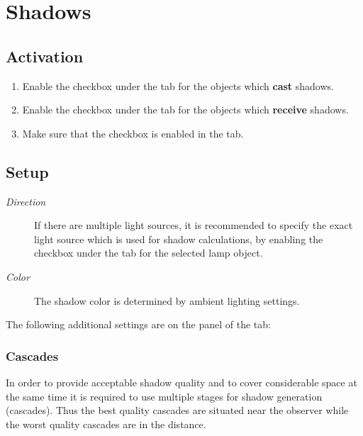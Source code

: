 \documentclass[a4paper,12pt,oneside]{sphinxmanual}
\begin{document}
\section{Shadows}
\label{lighting:id8}

\subsection{Activation}
\label{lighting:id9}\begin{enumerate}
\item {} 
Enable the  checkbox under the  tab for the objects which \textbf{cast} shadows.

\item {} 
Enable the  checkbox under the  tab for the objects which \textbf{receive} shadows.

\item {} 
Make sure that the  checkbox is enabled in the  tab.

\end{enumerate}


\subsection{Setup}
\label{lighting:id10}\begin{description}
\item[{\emph{Direction}}] \leavevmode
If there are multiple light sources, it is recommended to specify the exact light source which is used for shadow calculations, by enabling the  checkbox under the  tab for the selected lamp object.

\item[{\emph{Color}}] \leavevmode
The shadow color is determined by ambient lighting settings.

\end{description}

The following additional settings are on the  panel of the  tab:


\subsubsection{Cascades}
\label{lighting:id11}
In order to provide acceptable shadow quality and to cover considerable space at the same time it is required to use multiple stages for shadow generation (cascades). Thus the best quality cascades are situated near the observer while the worst quality cascades are in the distance.
\end{document}
